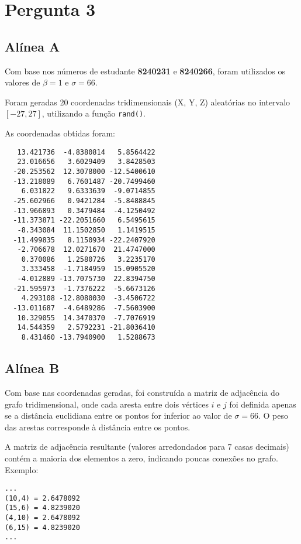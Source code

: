 \chapter{Pergunta 3}
\section*{Alínea A}

Com base nos números de estudante \textbf{8240231} e \textbf{8240266}, foram utilizados os valores de \(\beta = 1\) e \(\sigma = 66\).

Foram geradas 20 coordenadas tridimensionais (X, Y, Z) aleatórias no intervalo \([-27, 27]\), utilizando a função \texttt{rand()}.

As coordenadas obtidas foram:

\begin{verbatim}
   13.421736  -4.8380814   5.8564422
   23.016656   3.6029409   3.8428503
  -20.253562  12.3078000 -12.5400610
  -13.218089   6.7601487 -20.7499460
    6.031822   9.6333639  -9.0714855
  -25.602966   0.9421284  -5.8488845
  -13.966893   0.3479484  -4.1250492
  -11.373871 -22.2051660   6.5495615
   -8.343084  11.1502850   1.1419515
  -11.499835   8.1150934 -22.2407920
   -2.706678  12.0271670  21.4747000
    0.370086   1.2580726   3.2235170
    3.333458  -1.7184959  15.0905520
   -4.012889 -13.7075730  22.8394750
  -21.595973  -1.7376222  -5.6673126
    4.293108 -12.8080030  -3.4506722
  -13.011687  -4.6489286  -7.5603900
   10.329055  14.3470370  -7.7076919
   14.544359   2.5792231 -21.8036410
    8.431460 -13.7940900   1.5288673
\end{verbatim}

\section*{Alínea B}

Com base nas coordenadas geradas, foi construída a matriz de adjacência do grafo tridimensional, onde cada aresta entre dois vértices \(i\) e \(j\) foi definida apenas se a distância euclidiana entre os pontos for inferior ao valor de \(\sigma = 66\). O peso das arestas corresponde à distância entre os pontos.

A matriz de adjacência resultante (valores arredondados para 7 casas decimais) contém a maioria dos elementos a zero, indicando poucas conexões no grafo. Exemplo:

\begin{verbatim}
... 
(10,4) = 2.6478092
(15,6) = 4.8239020
(4,10) = 2.6478092
(6,15) = 4.8239020
...
\end{verbatim}

